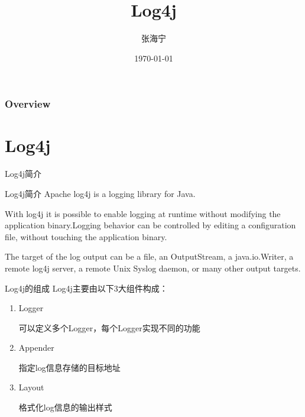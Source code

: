 \documentclass{beamer}
\title[Log4j]{Log4j} %
\author{张海宁} %
\institute[Guizhou University] %
{
贵州大学 \\ %
\medskip
\textit{hnzhang1@gzu.edu.cn} %
}
\date{\today} %
\begin{document}
\begin{frame}
\titlepage %
\end{frame}

\begin{frame}
\frametitle{Overview} %
\tableofcontents %
\end{frame}


\section{Log4j} %
\begin{frame}
\Huge{\centerline{Log4j简介}}
\end{frame}
\begin{frame}{Log4j简介}
Apache log4j is a logging library for Java.

With log4j it is possible to enable logging at runtime without modifying the application binary.Logging behavior can be controlled by editing a configuration file, without touching the application binary.

The target of the log output can be a file, an OutputStream, a java.io.Writer, a remote log4j server, a remote Unix Syslog daemon, or many other output targets.
\end{frame}

\begin{frame}{Log4j的组成}
Log4j主要由以下3大组件构成：
\begin{enumerate}
\item
Logger

可以定义多个Logger，每个Logger实现不同的功能
\item
Appender

指定log信息存储的目标地址
\item
Layout

格式化log信息的输出样式
\end{enumerate}
\end{frame}
\end{document}
